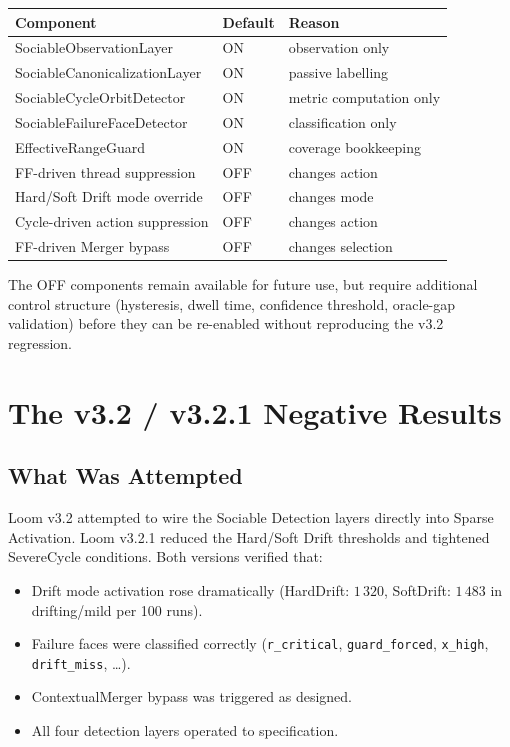 \begin{center}
\begin{tabular}{lll}
\toprule
\textbf{Component} & \textbf{Default} & \textbf{Reason} \\
\midrule
SociableObservationLayer & ON & observation only \\
SociableCanonicalizationLayer & ON & passive labelling \\
SociableCycleOrbitDetector & ON & metric computation only \\
SociableFailureFaceDetector & ON & classification only \\
EffectiveRangeGuard & ON & coverage bookkeeping \\
\midrule
FF-driven thread suppression & OFF & changes action \\
Hard/Soft Drift mode override & OFF & changes mode \\
Cycle-driven action suppression & OFF & changes action \\
FF-driven Merger bypass & OFF & changes selection \\
\bottomrule
\end{tabular}
\end{center}

\noindent The OFF components remain available for future use, but
require additional control structure (hysteresis, dwell time,
confidence threshold, oracle-gap validation) before they can be
re-enabled without reproducing the v3.2 regression.

\chapter{The v3.2 / v3.2.1 Negative Results}
\label{ch:v32_negative}

\section{What Was Attempted}

Loom v3.2 attempted to wire the Sociable Detection layers directly
into Sparse Activation. Loom v3.2.1 reduced the Hard/Soft Drift
thresholds and tightened SevereCycle conditions. Both versions
verified that:

\begin{itemize}
  \item Drift mode activation rose dramatically (HardDrift: $1\,320$,
    SoftDrift: $1\,483$ in drifting/mild per 100 runs).
  \item Failure faces were classified correctly
    (\texttt{r\_critical}, \texttt{guard\_forced}, \texttt{x\_high},
    \texttt{drift\_miss}, \dots).
  \item ContextualMerger bypass was triggered as designed.
  \item All four detection layers operated to specification.
\end{itemize}

